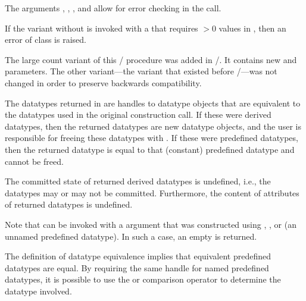 \begin{rationale}
The arguments , ,
,
and
 allow for error checking in the
call.
\end{rationale}

If the  variant without
 is invoked with a  that
requires $>0$ values in ,
then an error of class  is raised.

\begin{rationale}
  The large count variant of this \MPI/ procedure was added in \MPIIV/.
  It contains new  and
   parameters.  The
  other variant---the variant that existed before \MPIIV/---was
  not changed in order to preserve backwards compatibility.
\end{rationale}

The datatypes returned in  are handles to
datatype objects that are equivalent to the datatypes used in the
original construction call.  If these were derived datatypes, then
the returned datatypes are new datatype objects, and the
user is responsible for freeing these datatypes with
.
If these were predefined datatypes, then
the returned datatype is equal to that (constant) predefined datatype
and cannot be freed.

The committed state of returned derived datatypes is undefined,
i.e., the datatypes may or
may not be committed.  Furthermore, the content of attributes of
returned datatypes is undefined.

Note that  can be invoked with a
 argument that was constructed using
,\flushline
{}, or
  (an unnamed predefined datatype).
In such a case, an empty  is returned.

\begin{rationale}
The definition of datatype equivalence implies that equivalent
predefined datatypes are equal.
By requiring the same handle for named predefined datatypes, it is
possible to use the \code{==} or  comparison operator to determine the
datatype involved.
\end{rationale}

